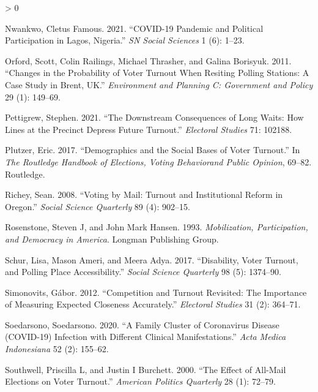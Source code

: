 \documentclass[
  12pt,
]{article}
\newlength{\cslhangindent}
\newenvironment{CSLReferences}[2] %
 {%
  \setlength{\parindent}{0pt}
  \ifodd #1 \everypar{\setlength{\hangindent}{\cslhangindent}}\ignorespaces\fi
  \ifnum #2 > 0
  \setlength{\parskip}{#2\baselineskip}
  \fi
 }%
 {}
\begin{document}
\begin{CSLReferences}{1}{0}
\leavevmode\hypertarget{ref-nwankwo2021covid}{}%
Nwankwo, Cletus Famous. 2021. {``COVID-19 Pandemic and Political
Participation in Lagos, Nigeria.''} \emph{SN Social Sciences} 1 (6):
1--23.

\leavevmode\hypertarget{ref-orford2011changes}{}%
Orford, Scott, Colin Railings, Michael Thrasher, and Galina Borisyuk.
2011. {``Changes in the Probability of Voter Turnout When Resiting
Polling Stations: A Case Study in Brent, UK.''} \emph{Environment and
Planning C: Government and Policy} 29 (1): 149--69.

\leavevmode\hypertarget{ref-pettigrew2021downstream}{}%
Pettigrew, Stephen. 2021. {``The Downstream Consequences of Long Waits:
How Lines at the Precinct Depress Future Turnout.''} \emph{Electoral
Studies} 71: 102188.

\leavevmode\hypertarget{ref-plutzer2017demographics}{}%
Plutzer, Eric. 2017. {``Demographics and the Social Bases of Voter
Turnout.''} In \emph{The Routledge Handbook of Elections, Voting
Behaviorand Public Opinion}, 69--82. Routledge.

\leavevmode\hypertarget{ref-richey2008voting}{}%
Richey, Sean. 2008. {``Voting by Mail: Turnout and Institutional Reform
in Oregon.''} \emph{Social Science Quarterly} 89 (4): 902--15.

\leavevmode\hypertarget{ref-rosenstone1993mobilization}{}%
Rosenstone, Steven J, and John Mark Hansen. 1993. \emph{Mobilization,
Participation, and Democracy in America}. Longman Publishing Group.

\leavevmode\hypertarget{ref-schur2017disability}{}%
Schur, Lisa, Mason Ameri, and Meera Adya. 2017. {``Disability, Voter
Turnout, and Polling Place Accessibility.''} \emph{Social Science
Quarterly} 98 (5): 1374--90.

\leavevmode\hypertarget{ref-simonovits2012competition}{}%
Simonovits, Gábor. 2012. {``Competition and Turnout Revisited: The
Importance of Measuring Expected Closeness Accurately.''}
\emph{Electoral Studies} 31 (2): 364--71.

\leavevmode\hypertarget{ref-soedarsono2020family}{}%
Soedarsono, Soedarsono. 2020. {``A Family Cluster of Coronavirus Disease
(COVID-19) Infection with Different Clinical Manifestations.''}
\emph{Acta Medica Indonesiana} 52 (2): 155--62.

\leavevmode\hypertarget{ref-southwell2000effect}{}%
Southwell, Priscilla L, and Justin I Burchett. 2000. {``The Effect of
All-Mail Elections on Voter Turnout.''} \emph{American Politics
Quarterly} 28 (1): 72--79.


\end{CSLReferences}
\end{document}
